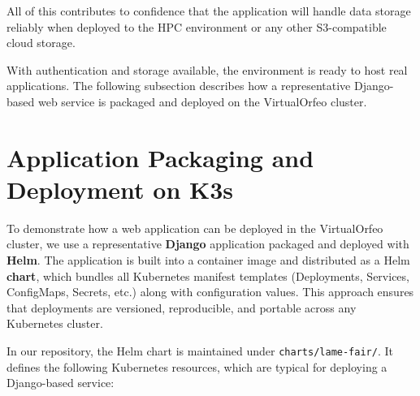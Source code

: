 All of this contributes to confidence that the application will handle data 
storage reliably when deployed to the HPC environment or any other S3-compatible 
cloud storage.

\medskip
\noindent With authentication and storage available, the environment is ready 
to host real applications. 
The following subsection describes how a representative Django-based web service 
is packaged and deployed on the VirtualOrfeo cluster.


\section{Application Packaging and Deployment on K3s}

To demonstrate how a web application can be deployed in the VirtualOrfeo cluster, 
we use a representative \textbf{Django} application packaged and deployed with 
\textbf{Helm}. The application is built into a container image and distributed 
as a Helm \textbf{chart}, which bundles all Kubernetes manifest templates 
(Deployments, Services, ConfigMaps, Secrets, etc.) along with configuration 
values. This approach ensures that deployments are versioned, reproducible, and 
portable across any Kubernetes cluster.

\medskip

In our repository, the Helm chart is maintained under \texttt{charts/lame-fair/}. 
It defines the following Kubernetes resources, which are typical for deploying a 
Django-based service:  

